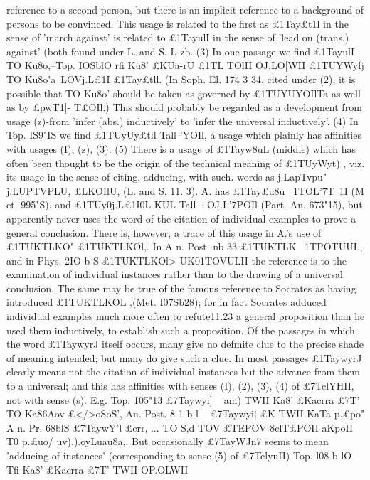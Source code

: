 {{{{{{{{{{{{{{{{{reference to a second person, but there is an implicit reference
to a background of persons to be convinced. This usage is related
to the first as £1Tay£t1l in the sense of 'march against' is related to
£1TayulI in the sense of 'lead on (trans.) against' (both found under
L. and S. I. zb.
(3) In one passage we find £1TayulI TO Ku8o,\ov--Top. IOSblO
rfi Ku8'
£KUa-rU £1TL TOlII OJ.LO[WII £1TUYWyfj TO Ku8o'\ov a~LOVj.L£1I £1Tay£tll.
(In Soph. El. 174 3 34, cited under (2), it is possible that TO Ku8o'\ov
should be taken as governed by £1TUYUYOIlTa as well as by £pwT1]-
T£OIl.) This should probably be regarded as a development from
usage (z)-from 'infer (abs.) inductively' to 'infer the universal
inductively'.
(4) In Top. IS9"IS we find £1TUyUy£tll Tall '\0YOIl, a usage which
plainly has affinities with usages (I), (z), (3).
(5) There is a usage of £1Tayw8uL (middle) which has often been
thought to be the origin of the technical meaning of £1TUyWyt) ,
viz. its usage in the sense of citing, adducing, with such. words
as j.LapTvpu" j.LUPTVPLU, £LKOIlU, (L. and S. 11. 3). A. has £1Tay£u8u~
1TOL'7T~1I (M et. 995"S), and £1TUy0j.L£1I0L KUL Tall ·OJ.L'7POIl (Part. An.
673"15), but apparently never uses the word of the citation of
individual examples to prove a general conclusion. There is,
however, a trace of this usage in A.'s use of £1TUKTLKO" £1TUKTLKOl,.
In A n. Post. nb 33 £1TUKTLK~ 1TPOTUUL, and in Phys. 2IO b S £1TUKTLKOl>
UK01TOVULII the reference is to the examination of individual
instances rather than to the drawing of a universal conclusion.
The same may be true of the famous reference to Socrates as
having introduced £1TUKTLKOL ,\OYOL (Met. I07Sb28); for in fact
Socrates adduced individual examples much more often to refute11.23
a general proposition than he used them inductively, to establish
such a proposition.
Of the passages in which the word £1TaywyrJ itself occurs, many
give no defmite clue to the precise shade of meaning intended;
but many do give such a clue. In most passages £1TaywyrJ clearly
means not the citation of individual instances but the advance
from them to a universal; and this has affinities with senses (I),
(2), (3), (4) of £7TclYHII, not with sense (s). E.g. Top. 105"13 £7Taywyi]
~ am) TWII Ka8' £Kacrra £7T' TO Ka86Aov £</>oSoS', An. Post. 8 1 b l ~
£7Taywyi] £K TWII KaTa p.£po" A n. Pr. 68blS £7TaywY'l £crr, ... TO S,d
TOV £TEPOV 8clT£POII aKpoII T0 p.£uo/ uv).).oyLuau8a,. But occasionally
£7TayWJn7 seems to mean 'adducing of instances' (corresponding to
sense (5) of £7TclyuII)-Top. l08 b lO Tfi Ka8' £Kacrra £7T' TWII OP.OLWII
}}}}}}}}}}}}}}}}}

